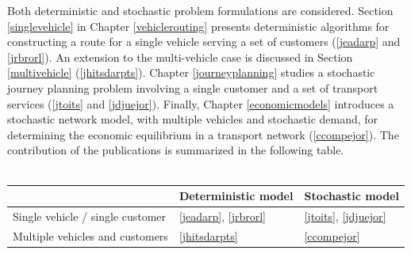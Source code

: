 \documentclass[dissertation,draft*]{aaltoseries}
\begin{document}
Both deterministic and stochastic problem formulations are considered. 
Section \ref{singlevehicle} in Chapter \ref{vehiclerouting} presents deterministic algorithms for constructing a route for a 
single vehicle serving a set of customers (\ref{jeadarp} and \ref{jrbrorl}). 
An extension to the multi-vehicle case is discussed in Section \ref{multivehicle} (\ref{jhitsdarpts}). 
Chapter \ref{journeyplanning} studies a stochastic
journey planning problem involving a single customer and a set of transport services (\ref{jtoits} and \ref{jdjuejor}). 
Finally, Chapter \ref{economicmodels} introduces a 
stochastic network model, with multiple vehicles and stochastic demand, for determining the economic equilibrium in a transport network (\ref{ccompejor}). 
The contribution of the publications is summarized in the following table. %
\\
\\
{\footnotesize
\begin{tabular}{p{4.3cm}|p{3.7cm}|p{3.7 cm}|}  
\cline{2-3}  
 & Deterministic model & Stochastic model \\
\hline
\multicolumn{1}{|p{4cm}|}{Single vehicle / single customer} 
& \ref{jeadarp}, \ref{jrbrorl} 
&  \ref{jtoits}, \ref{jdjuejor} \\
 \hline        
 \multicolumn{1}{|p{4.3cm}|}{Multiple vehicles and customers} & \ref{jhitsdarpts} & \ref{ccompejor} \\
 \hline  
\end{tabular} 
}



% 
% 
% 
%    
\end{document}
